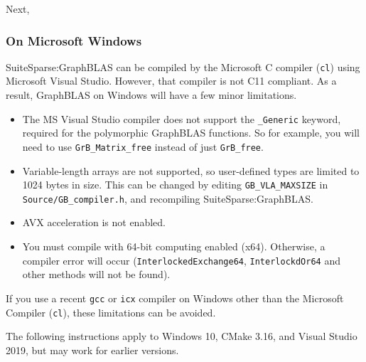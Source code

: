 \noindent
Next,

\subsubsection{On Microsoft Windows}
\label{sec:windows}

SuiteSparse:GraphBLAS can be compiled by the Microsoft C compiler (\verb'cl')
using Microsoft Visual Studio.  However, that compiler is not C11 compliant. As
a result, GraphBLAS on Windows will have a few minor limitations.

\begin{itemize}
\item The MS Visual Studio compiler does not support the \verb'_Generic'
keyword, required for the polymorphic GraphBLAS functions.  So for example, you
will need to use \verb'GrB_Matrix_free' instead of just \verb'GrB_free'.

\item Variable-length arrays are not supported, so user-defined
types are limited to 1024 bytes in size.  This can be changed by editing
\verb'GB_VLA_MAXSIZE' in \verb'Source/GB_compiler.h', and recompiling
SuiteSparse:GraphBLAS.

\item AVX acceleration is not enabled.

\item You must compile with 64-bit computing enabled (x64).  Otherwise, a
compiler error will occur (\verb'InterlockedExchange64', \verb'InterlockdOr64'
and other methods will not be found).

\end{itemize}

If you use a recent \verb'gcc' or \verb'icx' compiler on Windows other than the
Microsoft Compiler (\verb'cl'), these limitations can be avoided.

The following instructions apply to Windows 10, CMake 3.16, and
Visual Studio 2019, but may work for earlier versions.

